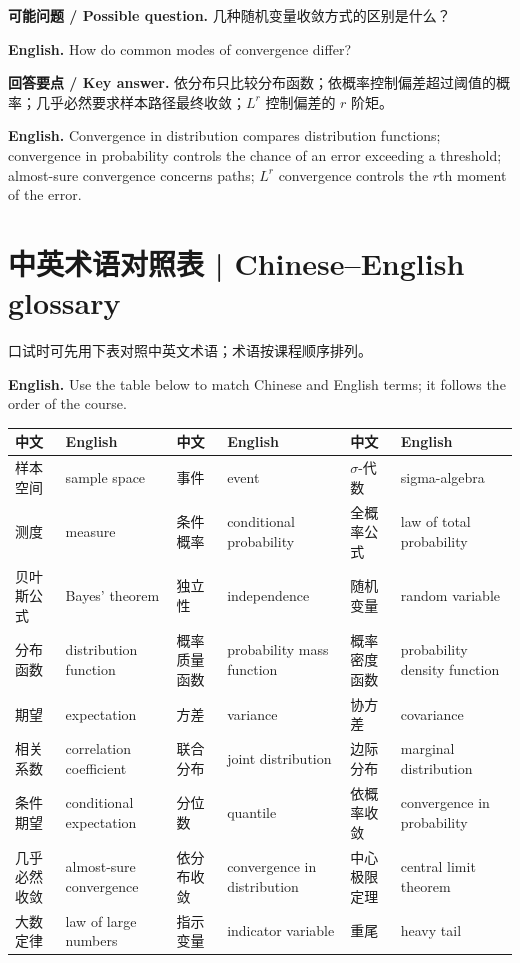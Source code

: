 \documentclass[UTF8,11pt,a4paper]{ctexart}
\newcommand{\EN}[1]{\par\noindent\textbf{English.} #1\par}
\newcommand{\ASK}[4]{\par\noindent\textbf{可能问题 / Possible question.} #1\par\EN{#2}\noindent\textbf{回答要点 / Key answer.} #3\par\EN{#4}\medskip}
\begin{document}
\ASK{几种随机变量收敛方式的区别是什么？}{How do common modes of convergence differ?}{依分布只比较分布函数；依概率控制偏差超过阈值的概率；几乎必然要求样本路径最终收敛；$L^r$ 控制偏差的 $r$ 阶矩。}{Convergence in distribution compares distribution functions; convergence in probability controls the chance of an error exceeding a threshold; almost-sure convergence concerns paths; $L^r$ convergence controls the $r$th moment of the error.}

\section*{中英术语对照表 | Chinese--English glossary}
\noindent 口试时可先用下表对照中英文术语；术语按课程顺序排列。
\EN{Use the table below to match Chinese and English terms; it follows the order of the course.}

{\footnotesize
\setlength{\tabcolsep}{2pt}
\begin{center}
\begin{tabular}{p{1.9cm}p{3.4cm}p{1.9cm}p{3.4cm}p{1.9cm}p{3.4cm}}
\hline
\textbf{中文} & \textbf{English} & \textbf{中文} & \textbf{English} & \textbf{中文} & \textbf{English} \\
\hline
样本空间 & sample space & 事件 & event & $\sigma$-代数 & sigma-algebra \\
测度 & measure & 条件概率 & conditional probability & 全概率公式 & law of total probability \\
贝叶斯公式 & Bayes' theorem & 独立性 & independence & 随机变量 & random variable \\
分布函数 & distribution function & 概率质量函数 & probability mass function & 概率密度函数 & probability density function \\
期望 & expectation & 方差 & variance & 协方差 & covariance \\
相关系数 & correlation coefficient & 联合分布 & joint distribution & 边际分布 & marginal distribution \\
条件期望 & conditional expectation & 分位数 & quantile & 依概率收敛 & convergence in probability \\
几乎必然收敛 & almost-sure convergence & 依分布收敛 & convergence in distribution & 中心极限定理 & central limit theorem \\
大数定律 & law of large numbers & 指示变量 & indicator variable & 重尾 & heavy tail \\
\hline
\end{tabular}
\end{center}
}
\end{document}

